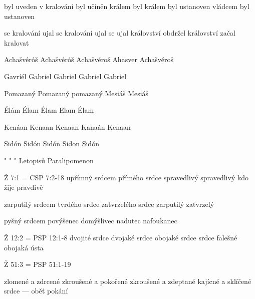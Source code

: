         {byl uveden v kralování} 
        {byl učiněn králem} 
        {byl králem} 
        {byl ustanoven vládcem} 
        {byl ustanoven}
          
         
      {se kralování ujal}
      {se kralování ujal}
      {se ujal království}
      {obdržel království}
      {začal kralovat}
      



 {Achašvéróš} {Achašvéróš} {Achašvéroš} {Ahasver} {Achašvéroš}
  
 {Gavríél} {Gabriel} {Gabriel} {Gabriel} {Gabriel}
  

  
 {Pomazaný} {Pomazaný} {pomazaný} {Mesiáš} {Mesiáš}
  
  {Élám} {Élam}  {Élam} {Elam} {Élam} 
  
        {Kenáan}  %
        {Kenaan}  %
        {Kenaan}  %
        {Kanaán}  %
        {Kenaan}  %
  
 {Sidón} {Sidón} {Sidón} {Sidon} {Sidón}  

 {"} {"} {"} {Letopisů} {Paralipomenon}  

\renum Ž 7:1 = CSP 7:2-18
        {upřímný srdcem}  %
        {přímého srdce}  %
        {spravedlivý}  %
        {spravedlivý}  %
        {kdo žije pravdivě}  %
          

        {zarputilý srdcem}  %
        {tvrdého srdce}  %
        {zatvrzelého srdce}  %
        {zarputilý}  %
        {zatvrzelý}  %
          
   
        {pyšný srdcem}  %
        {povýšenec}  %
        {domýšlivec}  %
        {nadutec}  %
        {nafoukanec}  %
          


\renum Ž 12:2 = PSP 12:1-8
        {dvojité srdce}  %
        {dvojaké srdce}  %
        {obojaké srdce}  %
        {srdce falešné}  %
        {obojaká ústa}  %
          
        


\renum Ž 51:3 = PSP 51:1-19
        
        {zlomené a zdrcené}  %
        {zkroušené a pokořené}  %
        {zkroušené a zdeptané}  %
        {kajícné a sklíčené}  %
        {srdce --- oběť pokání}  %
          

